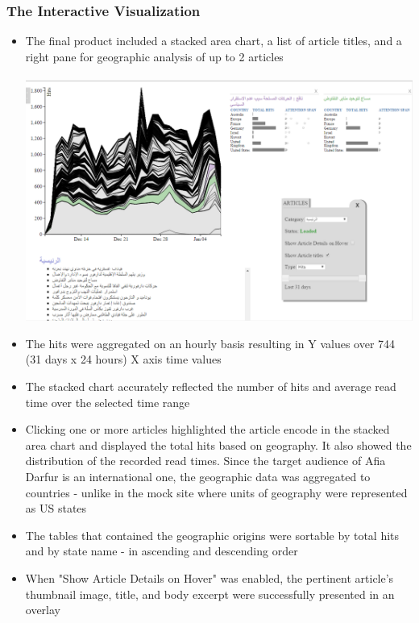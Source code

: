 \documentclass[12pt]{article}
\begin{document}
\subsubsection{The Interactive Visualization}
\begin{itemize}
\item The final product included a stacked area chart, a list of article titles, and a right pane for geographic analysis of up to 2 articles
\\ \\
\noindent\includegraphics[scale=0.5]{img/afiadarfur_main_viz} \\
\item The hits were aggregated on an hourly basis resulting in Y values over 744 (31 days x 24 hours) X axis time values
\item The stacked chart accurately reflected the number of hits and average read time over the selected time range
\item Clicking one or more articles highlighted the article encode in the stacked area chart and displayed the total hits based on geography. It also showed the distribution of the recorded read times. Since the target audience of Afia Darfur is an international one, the geographic data was aggregated to countries - unlike in the mock site where units of geography were represented as US states
\item The tables that contained the geographic origins were sortable by total hits and by state name - in ascending and descending order
\item When "Show Article Details on Hover" was enabled, the pertinent article's thumbnail image, title, and body excerpt were successfully presented in an overlay \\ \\

\end{itemize}
\end{document}
